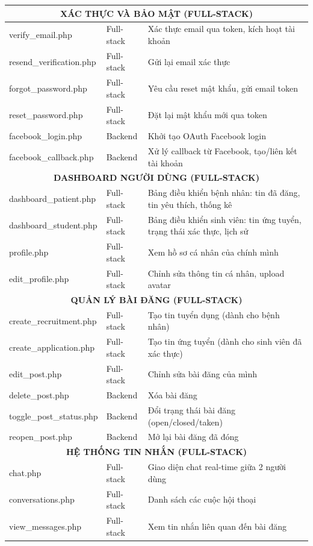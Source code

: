 \documentclass[a4paper,12pt]{article}
\begin{document}
\begin{longtable}{|p{4.5cm}|p{2cm}|p{8cm}|}
\multicolumn{3}{|c|}{\textbf{XÁC THỰC VÀ BẢO MẬT (FULL-STACK)}} \\
\hline
verify\_email.php & Full-stack & Xác thực email qua token, kích hoạt tài khoản \\
\hline
resend\_verification.php & Full-stack & Gửi lại email xác thực \\
\hline
forgot\_password.php & Full-stack & Yêu cầu reset mật khẩu, gửi email token \\
\hline
reset\_password.php & Full-stack & Đặt lại mật khẩu mới qua token \\
\hline
facebook\_login.php & Backend & Khởi tạo OAuth Facebook login \\
\hline
facebook\_callback.php & Backend & Xử lý callback từ Facebook, tạo/liên kết tài khoản \\
\hline

\multicolumn{3}{|c|}{\textbf{DASHBOARD NGƯỜI DÙNG (FULL-STACK)}} \\
\hline
dashboard\_patient.php & Full-stack & Bảng điều khiển bệnh nhân: tin đã đăng, tin yêu thích, thống kê \\
\hline
dashboard\_student.php & Full-stack & Bảng điều khiển sinh viên: tin ứng tuyển, trạng thái xác thực, lịch sử \\
\hline
profile.php & Full-stack & Xem hồ sơ cá nhân của chính mình \\
\hline
edit\_profile.php & Full-stack & Chỉnh sửa thông tin cá nhân, upload avatar \\
\hline

\multicolumn{3}{|c|}{\textbf{QUẢN LÝ BÀI ĐĂNG (FULL-STACK)}} \\
\hline
create\_recruitment.php & Full-stack & Tạo tin tuyển dụng (dành cho bệnh nhân) \\
\hline
create\_application.php & Full-stack & Tạo tin ứng tuyển (dành cho sinh viên đã xác thực) \\
\hline
edit\_post.php & Full-stack & Chỉnh sửa bài đăng của mình \\
\hline
delete\_post.php & Backend & Xóa bài đăng \\
\hline
toggle\_post\_status.php & Backend & Đổi trạng thái bài đăng (open/closed/taken) \\
\hline
reopen\_post.php & Backend & Mở lại bài đăng đã đóng \\
\hline

\multicolumn{3}{|c|}{\textbf{HỆ THỐNG TIN NHẮN (FULL-STACK)}} \\
\hline
chat.php & Full-stack & Giao diện chat real-time giữa 2 người dùng \\
\hline
conversations.php & Full-stack & Danh sách các cuộc hội thoại \\
\hline
view\_messages.php & Full-stack & Xem tin nhắn liên quan đến bài đăng \\
\hline


\end{longtable}
\end{document}
